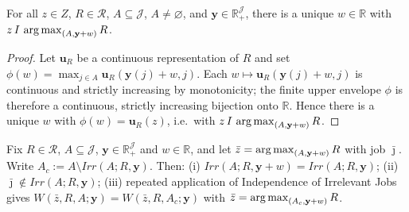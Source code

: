 \begin{lemma}
\label{lem:w3exists}
For all $z\in Z$, $R\in\mathcal R$, $A\subseteq\mathcal J$, $A\neq\varnothing$,
and $\mathbf y\in\mathbb R_+^{\mathcal J}$, there is a unique $w\in\mathbb R$
with $z\,I\,\operatorname*{arg\,max}_{(A,\mathbf y+w)}R$.
\end{lemma}

\begin{proof}
Let $\mathbf u_R$ be a continuous representation of $R$ and set
$\phi(w)=\max_{j\in A}\mathbf u_R(\mathbf y(j)+w,j)$. Each
$w\mapsto\mathbf u_R(\mathbf y(j)+w,j)$ is continuous and strictly increasing by
monotonicity; the finite upper envelope $\phi$ is therefore a continuous,
strictly increasing bijection onto $\mathbb R$. Hence there is a unique $w$ with
$\phi(w)=\mathbf u_R(z)$, i.e.\ with $z\,I\,\operatorname*{arg\,max}_{(A,\mathbf y+w)}R$.
\end{proof}

\begin{lemma}
\label{lem:w3trim}
Fix $R\in\mathcal R$, $A\subseteq\mathcal J$, $\mathbf y\in\mathbb R_+^{\mathcal
J}$ and $w\in\mathbb R$, and let $\bar z=\operatorname*{arg\,max}_{(A,\mathbf y+w)}R$ with job
$\bar\jmath$. Write $A_c:=A\setminus Irr(A;R,\mathbf y)$. Then:
(i) $Irr(A;R,\mathbf y+w)=Irr(A;R,\mathbf y)$;
(ii) $\bar\jmath\notin Irr(A;R,\mathbf y)$;
(iii) repeated application of Independence of Irrelevant Jobs gives
$W(\bar z,R,A;\mathbf y)=W(\bar z,R,A_c;\mathbf y)$ with
$\bar z=\operatorname*{arg\,max}_{(A_c,\mathbf y+w)}R$.
\end{lemma}

